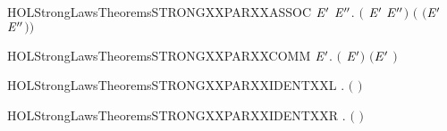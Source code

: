 \newcommand{\HOLStrongLawsTheoremsSTRONGXXLEFTXXSUMXXMIDXXIDEMP}{\UseVerbatim{HOLStrongLawsTheoremsSTRONGXXLEFTXXSUMXXMIDXXIDEMP}}
\begin{SaveVerbatim}{HOLStrongLawsTheoremsSTRONGXXPARXXASSOC}
\HOLTokenTurnstile{} \HOLSymConst{\HOLTokenForall{}} \ensuremath{\HOLBoundVar{E}\sp{\prime{}}} \ensuremath{\HOLBoundVar{E}\sp{\prime{}\prime{}}}.  \ensuremath{(} \HOLSymConst{\ensuremath{\mid}} \ensuremath{\HOLBoundVar{E}\sp{\prime{}}} \HOLSymConst{\ensuremath{\mid}} \ensuremath{\HOLBoundVar{E}\sp{\prime{}\prime{}}}\ensuremath{)} \ensuremath{(} \HOLSymConst{\ensuremath{\mid}} \ensuremath{(}\ensuremath{\HOLBoundVar{E}\sp{\prime{}}} \HOLSymConst{\ensuremath{\mid}} \ensuremath{\HOLBoundVar{E}\sp{\prime{}\prime{}}}\ensuremath{)}\ensuremath{)}
\end{SaveVerbatim}
\newcommand{\HOLStrongLawsTheoremsSTRONGXXPARXXASSOC}{\UseVerbatim{HOLStrongLawsTheoremsSTRONGXXPARXXASSOC}}
\begin{SaveVerbatim}{HOLStrongLawsTheoremsSTRONGXXPARXXCOMM}
\HOLTokenTurnstile{} \HOLSymConst{\HOLTokenForall{}} \ensuremath{\HOLBoundVar{E}\sp{\prime{}}}.  \ensuremath{(} \HOLSymConst{\ensuremath{\mid}} \ensuremath{\HOLBoundVar{E}\sp{\prime{}}}\ensuremath{)} \ensuremath{(}\ensuremath{\HOLBoundVar{E}\sp{\prime{}}} \HOLSymConst{\ensuremath{\mid}} \ensuremath{)}
\end{SaveVerbatim}
\newcommand{\HOLStrongLawsTheoremsSTRONGXXPARXXCOMM}{\UseVerbatim{HOLStrongLawsTheoremsSTRONGXXPARXXCOMM}}
\begin{SaveVerbatim}{HOLStrongLawsTheoremsSTRONGXXPARXXIDENTXXL}
\HOLTokenTurnstile{} \HOLSymConst{\HOLTokenForall{}}.  \ensuremath{(} \HOLSymConst{\ensuremath{\mid}} \ensuremath{)} 
\end{SaveVerbatim}
\newcommand{\HOLStrongLawsTheoremsSTRONGXXPARXXIDENTXXL}{\UseVerbatim{HOLStrongLawsTheoremsSTRONGXXPARXXIDENTXXL}}
\begin{SaveVerbatim}{HOLStrongLawsTheoremsSTRONGXXPARXXIDENTXXR}
\HOLTokenTurnstile{} \HOLSymConst{\HOLTokenForall{}}.  \ensuremath{(} \HOLSymConst{\ensuremath{\mid}} \ensuremath{)} 
\end{SaveVerbatim}
\newcommand{\HOLStrongLawsTheoremsSTRONGXXPARXXIDENTXXR}{\UseVerbatim{HOLStrongLawsTheoremsSTRONGXXPARXXIDENTXXR}}
